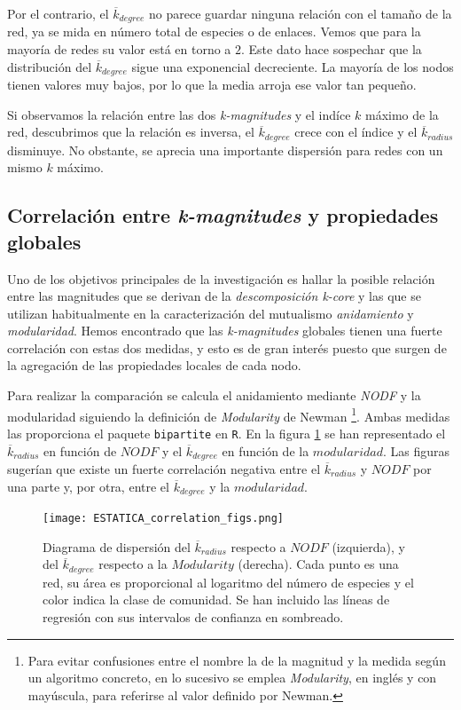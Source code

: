 Por el contrario, el $\overline{k}_{degree}$ no parece guardar ninguna relación con el tamaño de la red, ya se mida en número total de especies o de enlaces. Vemos que para la mayoría de redes su valor está en torno a $2$. Este dato hace sospechar que la distribución del $\overline{k}_{degree}$ sigue una exponencial decreciente. La mayoría de los nodos tienen valores muy bajos, por lo que la media arroja ese valor tan pequeño.

Si observamos la relación entre las dos \textit{k-magnitudes} y el indíce $k$ máximo de la red, descubrimos que la relación es inversa, el $\overline{k}_{degree}$ crece con el índice y el $\overline{k}_{radius}$ disminuye. No obstante, se aprecia una importante dispersión para redes con un mismo $k$ máximo.

\subsection{Correlación entre \textit{k-magnitudes} y propiedades globales}

Uno de los objetivos principales de la investigación es hallar la posible relación entre las magnitudes que se derivan de la \textit{descomposición k-core} y las que se utilizan habitualmente en la caracterización del mutualismo \textit{anidamiento} y \textit{modularidad}. Hemos encontrado que las \textit{k-magnitudes} globales tienen una fuerte correlación con estas dos medidas, y esto es de gran interés puesto que surgen de la agregación de las propiedades locales de cada nodo.

Para realizar la comparación se calcula el anidamiento mediante \textit{NODF} \cite{almeida2008consistent} y la modularidad siguiendo la definición de \textit{Modularity} de Newman \cite{newman2004finding} \footnote{Para evitar confusiones entre el nombre la de la magnitud y la medida según un algoritmo concreto, en lo sucesivo se emplea \textit{Modularity}, en inglés y con mayúscula, para referirse al valor definido por Newman.}. Ambas medidas las proporciona el paquete \texttt{bipartite} en \texttt{R}. En la figura \ref{fig:ESTATICA_corrfigs} se han representado el $\overline {k}_{radius}$ en función de $NODF$ y el $\overline {k}_{degree}$ en función de la $modularidad$. Las figuras sugerían que existe un fuerte correlación negativa entre el $\overline {k}_{radius}$ y $NODF$ por una parte y, por otra, entre el $\overline {k}_{degree}$ y la $modularidad$. 

\begin{figure}[h!]
\centering
\texttt{[image: ESTATICA\_correlation\_figs.png]}
\caption {Diagrama de dispersión del $\overline {k}_{radius}$ respecto a $NODF$ (izquierda), y del $\overline {k}_{degree}$ respecto a la $Modularity$ (derecha). Cada punto es una red, su área es proporcional al logaritmo del número de especies y el color indica la clase de comunidad. Se han incluido las líneas de regresión con sus intervalos de confianza en sombreado.}
\label{fig:ESTATICA_corrfigs}
\end{figure}

